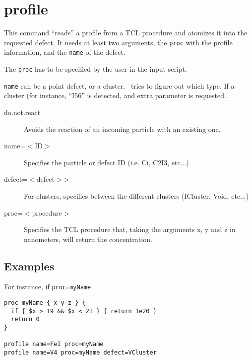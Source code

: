 \section{profile}

This command ``reads'' a profile from a TCL procedure and atomizes it into the requested defect. It needs at least two arguments, the {\tt proc} with the profile information, and the {\tt name} of the defect.

The {\tt proc} has to be specified by the user in the input script.

{\tt name} can be a point defect, or a cluster. \MMonCa\ tries to figure out which type. If a
cluster (for instance, ``I56'' is detected, and extra parameter  is requested.

\begin{description}
\item [do.not.react] Avoids the reaction of an incoming particle with an existing one.
\item [name=$<$ID$>$] Specifies the particle or defect ID (i.e. Ci, C2I3, etc...)
\item [defect=$<$defect$>$>] For clusters, specifies between the different clusters (ICluster, Void, etc...)
\item [proc=$<$procedure$>$] Specifies the TCL procedure that, taking the arguments x, y and z in nanometers, will return the concentration.
\end{description}

\subsection{Examples}
 For instance, if {\tt proc=myName}

\begin{lstlisting}
proc myName { x y z } {
  if { $x > 19 && $x < 21 } { return 1e20 }
  return 0
}

profile name=FeI proc=myName
profile name=V4 proc=myName defect=VCluster
\end{lstlisting}
